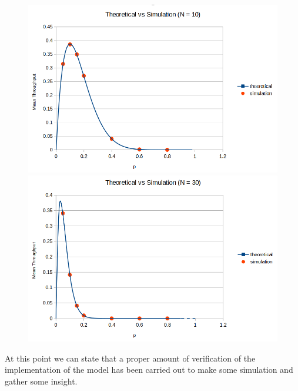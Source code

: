 \begin{figure}[H]
	\begin{minipage}[b]{0.55\textwidth}
		\includegraphics[width=\textwidth]{img/SecondVerificationN10.png}
	\end{minipage}
	\begin{minipage}[b]{0.55\textwidth}
		\includegraphics[width=\textwidth]{img/SecondVerificationN30.png}
	\end{minipage}
\end{figure}
\noindent At this point we can state that a proper amount of verification of the implementation of the model has been carried out to make some simulation and gather some insight. %